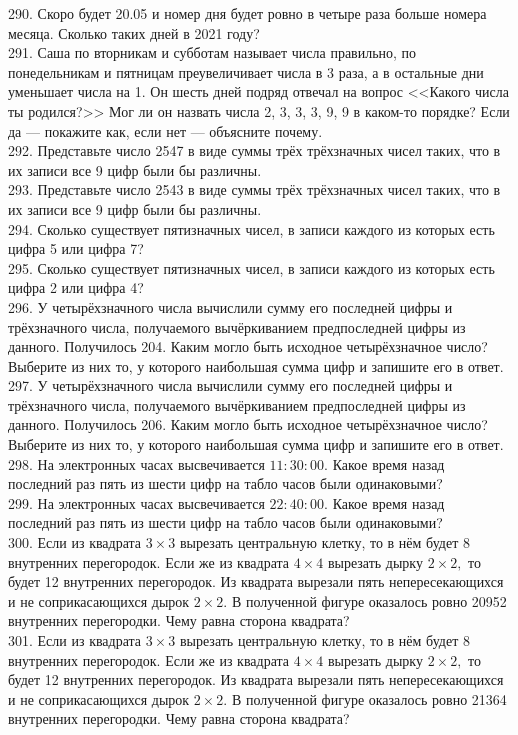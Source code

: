 \documentclass[12pt]{article}
\begin{document}
290. Скоро будет 20.05 и номер дня будет ровно в четыре раза больше номера месяца. Сколько таких дней в 2021 году?\\
291. Саша по вторникам и субботам называет числа правильно, по понедельникам и пятницам преувеличивает числа в 3 раза, а в остальные дни уменьшает числа на 1. Он шесть дней подряд отвечал на вопрос <<Какого числа ты родился?>> Мог ли он назвать числа 2, 3, 3, 3, 9, 9 в каком-то порядке? Если да --- покажите как, если нет --- объясните почему.\\
292. Представьте число 2547 в виде суммы трёх трёхзначных чисел таких, что в их записи все 9 цифр были бы различны.\\
293. Представьте число 2543 в виде суммы трёх трёхзначных чисел таких, что в их записи все 9 цифр были бы различны.\\
294. Сколько существует пятизначных чисел, в записи каждого из которых есть цифра 5 или цифра 7?\\
295. Сколько существует пятизначных чисел, в записи каждого из которых есть цифра 2 или цифра 4?\\
296. У четырёхзначного числа вычислили сумму его последней цифры и трёхзначного числа, получаемого вычёркиванием предпоследней цифры из данного. Получилось 204. Каким могло быть исходное четырёхзначное число? Выберите из них то, у которого наибольшая сумма цифр и запишите его в ответ.\\
297. У четырёхзначного числа вычислили сумму его последней цифры и трёхзначного числа, получаемого вычёркиванием предпоследней цифры из данного. Получилось 206. Каким могло быть исходное четырёхзначное число? Выберите из них то, у которого наибольшая сумма цифр и запишите его в ответ.\\
298. На электронных часах высвечивается $11:30:00.$ Какое время назад последний раз пять из шести цифр на табло часов были одинаковыми?\\
299. На электронных часах высвечивается $22:40:00.$ Какое время назад последний раз пять из шести цифр на табло часов были одинаковыми?\\
300. Если из квадрата $3\times3$ вырезать центральную клетку, то в нём будет 8 внутренних перегородок. Если же из квадрата $4\times4$ вырезать дырку $2\times2,$ то будет 12 внутренних перегородок. Из квадрата вырезали пять непересекающихся и не соприкасающихся дырок $2\times2.$ В полученной фигуре оказалось ровно 20952 внутренних перегородки. Чему равна сторона квадрата?\\
301. Если из квадрата $3\times3$ вырезать центральную клетку, то в нём будет 8 внутренних перегородок. Если же из квадрата $4\times4$ вырезать дырку $2\times2,$ то будет 12 внутренних перегородок. Из квадрата вырезали пять непересекающихся и не соприкасающихся дырок $2\times2.$ В полученной фигуре оказалось ровно 21364 внутренних перегородки. Чему равна сторона квадрата?\\
\end{document}
